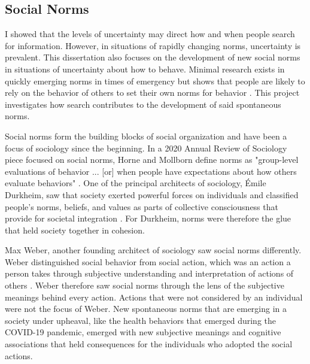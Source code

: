 \subsection{Social Norms}
I showed that the levels of uncertainty may direct how and when people search
for information. However, in situations of rapidly changing norms, uncertainty
is prevalent. This dissertation also focuses on the development of new social
norms in situations of uncertainty about how to behave. Minimal research exists
in quickly emerging norms in times of emergency but shows that people are likely
to rely on the behavior of others to set their own norms for behavior
\citep{alvarez2018, horneNormsIntegratedFramework2020}. This project
investigates how search contributes to the development of said spontaneous
norms.

Social norms form the building blocks of social organization and have been a
focus of sociology since the beginning. In a 2020 Annual Review of Sociology
piece focused on social norms, Horne and Mollborn define norms as "group-level
evaluations of behavior ... [or] when people have expectations about how others
evaluate behaviors" \citeyearpar[p. 468-69]{horneNormsIntegratedFramework2020}.
One of the principal architects of sociology, \'{E}mile Durkheim, saw that
society exerted powerful forces on individuals and classified people's norms,
beliefs, and values as parts of collective consciousness that provide for
societal integration \citeyearpar{durkheimSuicide1897,
durkheimDivisionLaborSociety1933}. For Durkheim, norms were therefore the glue
that held society together in cohesion.

Max Weber, another founding architect of sociology saw social norms differently.
Weber distinguished social behavior from social action, which was an action a
person takes through subjective understanding and interpretation of actions of
others \citeyearpar{weber1978economy}. Weber therefore saw social norms through
the lens of the subjective meanings behind every action. Actions that were not
considered by an individual were not the focus of Weber. New spontaneous norms
that are emerging in a society under upheaval, like the health behaviors that
emerged during the COVID-19 pandemic, emerged with new subjective meanings and
cognitive associations that held consequences for the individuals who adopted
the social actions.

